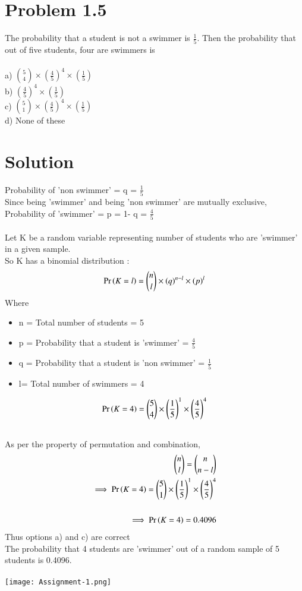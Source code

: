 \documentclass[journal,12pt,twocolumn]{IEEEtran}
\begin{document}
\section*{Problem 1.5}
The probability that a student is not a swimmer is $\frac{1}{5}$.
Then the probability that out of five students, four are swimmers is\\\\
a) ${{5}\choose{4}}\times\left(\frac{4}{5}\right)^4\times\left(\frac{1}{5}\right)$\\
b) $\left(\frac{4}{5}\right)^4\times\left(\frac{1}{5}\right)$\\
c) ${{5}\choose{1}}\times\left(\frac{4}{5}\right)^4\times\left(\frac{1}{5}\right)$\\
d) None of these 
\section*{Solution}
Probability of 'non swimmer' = q = $\frac{1}{5}$\\
Since being 'swimmer' and being 'non swimmer' are mutually exclusive,\\
Probability of 'swimmer' = p = 1- q = $\frac{4}{5}$\\\\
Let K be a random variable representing number of students who are 'swimmer' in a given sample.\\
So K has a binomial distribution : 
\begin{align}
\Pr\left(K=l\right) = {{n}\choose{l}} \times (q)^{n-l} \times (p)^{l}\label{0.0.1}
\end{align}
Where
\begin{itemize}
    \item n = Total number of students = 5
    \item p = Probability that a student is 'swimmer' = \( \frac{4}{5} \)
    \item q = Probability that a student is 'non swimmer' = \( \frac{1}{5} \)
    \item l= Total number of swimmers = 4
\end{itemize}
\bigskip
\begin{align}
\Pr\left(K = 4\right)={{5}\choose{4}} \times\left(\frac{1}{5}\right)^{1} \times \left(\frac{4}{5}\right)^{4}\\\notag
\end{align}
As per the property of permutation and combination,
\begin{align}
{{n}\choose{l}}={{n}\choose{n-l}}\\
\implies\Pr\left(K = 4\right)={{5}\choose{1}} \times\left(\frac{1}{5}\right)^{1} \times \left(\frac{4}{5}\right)^{4}\\\notag\\
\implies \Pr\left(K = 4\right) = 0.4096\notag
\end{align}
Thus options a) and c) are correct\\
The probability that 4 students are 'swimmer' out of a random sample of 5 students is 0.4096.\\\\
\texttt{[image: Assignment-1.png]}
\end{document}
